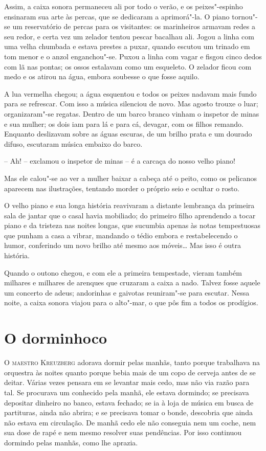Assim, a caixa sonora permaneceu ali por todo o verão, e os
peixes"-espinho ensinaram sua arte às percas, que se dedicaram a
aprimorá"-la. O piano tornou"-se um reservatório de percas para os
visitantes: os marinheiros armavam redes a seu redor, e certa vez um
zelador tentou pescar bacalhau ali. Jogou a linha com uma velha
chumbada e estava prestes a puxar, quando escutou um trinado em tom
menor e o anzol enganchou"-se. Puxou a linha com vagar e fisgou cinco
dedos com lã nas pontas; os ossos estalavam como um esqueleto. O
zelador ficou com medo e os atirou na água, embora soubesse o
que fosse aquilo.

A lua vermelha chegou; a água esquentou e todos os peixes nadavam mais
fundo para se refrescar. Com isso a música silenciou de novo. Mas
agosto trouxe o luar; organizaram"-se regatas. Dentro de um barco
branco vinham o inspetor de minas e sua mulher; os dois iam para lá e para cá,
devagar, com os filhos remando. Enquanto deslizavam sobre as  águas
escuras, de um brilho prata e um dourado difuso, escutaram música
embaixo do barco.

-- Ah! -- exclamou o inspetor de minas -- é a carcaça do nosso velho piano!

Mas ele calou"-se ao ver a mulher baixar a cabeça até o peito, como os
pelicanos aparecem nas ilustrações, tentando morder o próprio seio e
ocultar o rosto.

O velho piano e sua longa história reavivaram a distante lembrança da
primeira sala de jantar que o casal havia mobiliado; do primeiro filho
aprendendo a tocar piano e da tristeza nas noites longas, que sucumbia
apenas às notas tempestuosas que punham a casa a vibrar, mandando o
tédio embora e restabelecendo o humor, conferindo um novo brilho até
mesmo aos móveis\ldots{} Mas isso é outra história.
\asterisc

Quando o outono chegou, e com ele a primeira tempestade, vieram também
milhares e milhares de arenques que cruzaram a caixa a nado. Talvez
fosse aquele um concerto de adeus; andorinhas e gaivotas reuniram"-se
para escutar. Nessa noite, a caixa sonora viajou para o alto"-mar, o
que pôs fim a todos os prodígios.

\chapter{O dorminhoco}
\vspace{1em}

\textsc{O maestro Kreuzberg} adorava dormir pelas manhãs, tanto porque trabalhava
na orquestra às noites quanto porque bebia mais de um copo de cerveja
antes de se deitar. Várias vezes pensara em se levantar mais cedo, mas
não via razão para tal. Se procurava um conhecido pela manhã, ele
estava dormindo; se precisava depositar dinheiro no banco, estava
fechado; se ia à loja de música em busca de partituras, ainda não
abrira; e se precisava tomar o bonde, descobria que ainda não estava em
circulação. De manhã cedo ele não conseguia nem um coche, nem sua dose
de rapé e nem mesmo resolver suas pendências. Por isso continuou dormindo
pelas manhãs, como lhe aprazia.

